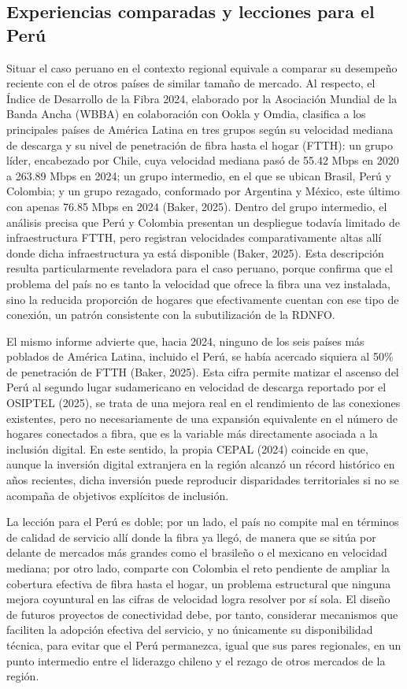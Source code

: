 \subsection{Experiencias comparadas y lecciones para el Perú}
Situar el caso peruano en el contexto regional equivale a comparar su desempeño reciente con el de otros países de similar tamaño de mercado. Al respecto, el Índice de Desarrollo de la Fibra 2024, elaborado por la Asociación Mundial de la Banda Ancha (WBBA) en colaboración con Ookla y Omdia, clasifica a los principales países de América Latina en tres grupos según su velocidad mediana de descarga y su nivel de penetración de fibra hasta el hogar (FTTH): un grupo líder, encabezado por Chile, cuya velocidad mediana pasó de 55.42 Mbps en 2020 a 263.89 Mbps en 2024; un grupo intermedio, en el que se ubican Brasil, Perú y Colombia; y un grupo rezagado, conformado por Argentina y México, este último con apenas 76.85 Mbps en 2024 (Baker, 2025). Dentro del grupo intermedio, el análisis precisa que Perú y Colombia presentan un despliegue todavía limitado de infraestructura FTTH, pero registran velocidades comparativamente altas allí donde dicha infraestructura ya está disponible (Baker, 2025). Esta descripción resulta particularmente reveladora para el caso peruano, porque confirma que el problema del país no es tanto la velocidad que ofrece la fibra una vez instalada, sino la reducida proporción de hogares que efectivamente cuentan con ese tipo de conexión, un patrón consistente con la subutilización de la RDNFO.

El mismo informe advierte que, hacia 2024, ninguno de los seis países más poblados de América Latina, incluido el Perú, se había acercado siquiera al 50\% de penetración de FTTH (Baker, 2025). Esta cifra permite matizar el ascenso del Perú al segundo lugar sudamericano en velocidad de descarga reportado por el OSIPTEL (2025), se trata de una mejora real en el rendimiento de las conexiones existentes, pero no necesariamente de una expansión equivalente en el número de hogares conectados a fibra, que es la variable más directamente asociada a la inclusión digital. En este sentido, la propia CEPAL (2024) coincide en que, aunque la inversión digital extranjera en la región alcanzó un récord histórico en años recientes, dicha inversión puede reproducir disparidades territoriales si no se acompaña de objetivos explícitos de inclusión.

La lección para el Perú es doble; por un lado, el país no compite mal en términos de calidad de servicio allí donde la fibra ya llegó, de manera que se sitúa por delante de mercados más grandes como el brasileño o el mexicano en velocidad mediana; por otro lado, comparte con Colombia el reto pendiente de ampliar la cobertura efectiva de fibra hasta el hogar, un problema estructural que ninguna mejora coyuntural en las cifras de velocidad logra resolver por sí sola. El diseño de futuros proyectos de conectividad debe, por tanto, considerar mecanismos que faciliten la adopción efectiva del servicio, y no únicamente su disponibilidad técnica, para evitar que el Perú permanezca, igual que sus pares regionales, en un punto intermedio entre el liderazgo chileno y el rezago de otros mercados de la región.


